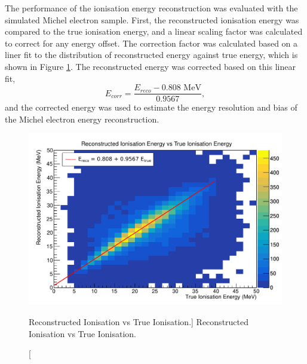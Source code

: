 The performance of the ionisation energy reconstruction was evaluated with the
simulated Michel electron sample. First, the reconstructed ionisation energy was
compared to the true ionisation energy, and a linear scaling factor was
calculated to correct for any energy offset. The correction factor was
calculated based on a liner fit to the distribution of reconstructed energy
against true energy, which is shown in Figure \ref{fig:reco_v_ion}. The
reconstructed energy was corrected based on this linear fit, 
\begin{equation*}
	E_{corr} = \frac{E_{reco}  - 0.808 \mbox{ MeV}}{0.9567},
\end{equation*}
and the corrected energy was used to estimate the energy resolution and bias of
the Michel electron energy reconstruction.
\begin{figure}
	\centering
	\includegraphics[width=\textwidth]{figures/reco_v_true_ion.pdf}
	\caption
	[Reconstructed Ionisation vs True Ionisation.]
	{Reconstructed Ionisation vs True Ionisation.}
	\label{fig:reco_v_ion}
\end{figure}

